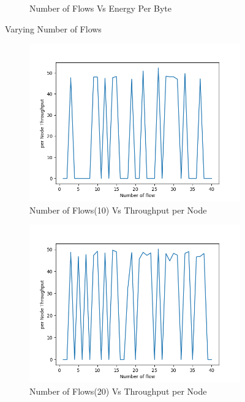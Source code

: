\begin{figure}[h]
\begin{subfigure}{.5\textwidth}
     \caption{Number of Flows Vs Energy Per Byte}
     \label{flow_energy_mobile_per_byte}
\end{subfigure}
\caption{Varying Number of Flows}
\label{fig:varyingFlow}
\end{figure}
\begin{figure}[h]
\begin{subfigure}{.5\textwidth}
  \centering
  \includegraphics[width=.8\linewidth]{_11_2_mobile/NumberofFlow(10)vsperNodeThroughput.png}
     \caption{Number of Flows(10) Vs Throughput per Node}
 \end{subfigure}
\begin{subfigure}{.5\textwidth}
  \centering
  \includegraphics[width=.8\linewidth]{_11_2_mobile/NumberofFlow(20)vsperNodeThroughput.png}
     \caption{Number of Flows(20) Vs Throughput per Node}
    \end{subfigure}
\begin{subfigure}{.5\textwidth}
    \centering

\end{subfigure}
\end{figure}
